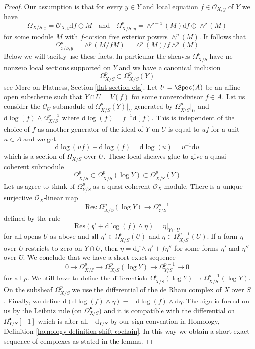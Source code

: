 \begin{proof}
Our assumption is that for every $y \in Y$ and local equation
$f \in \mathcal{O}_{X, y}$ of $Y$ we have
$$
\Omega_{X/S, y} = \mathcal{O}_{X, y}\text{d}f \oplus M
\quad\text{and}\quad
\Omega^p_{X/S, y} = \wedge^{p - 1}(M)\text{d}f \oplus \wedge^p(M)
$$
for some module $M$ with $f$-torsion free exterior powers $\wedge^p(M)$.
It follows that
$$
\Omega^p_{Y/S, y} = \wedge^p(M/fM) = \wedge^p(M)/f\wedge^p(M)
$$
Below we will tacitly use these facts.
In particular the sheaves $\Omega^p_{X/S}$ have no nonzero local
sections supported on $Y$ and we have a canonical inclusion
$$
\Omega^p_{X/S} \subset \Omega^p_{X/S}(Y)
$$
see More on Flatness, Section \ref{flat-section-eta}. Let $U = \Spec(A)$
be an affine open subscheme such that $Y \cap U = V(f)$ for some
nonzerodivisor $f \in A$. Let us consider the $\mathcal{O}_U$-submodule
of $\Omega^p_{X/S}(Y)|_U$ generated by
$\Omega^p_{X/S}|_U$ and $\text{d}\log(f) \wedge \Omega^{p - 1}_{X/S}$
where $\text{d}\log(f) = f^{-1}\text{d}(f)$.
This is independent of the choice of $f$ as another generator of the
ideal of $Y$ on $U$ is equal to $uf$ for a unit $u \in A$ and we get
$$
\text{d}\log(uf) - \text{d}\log(f) = \text{d}\log(u) = u^{-1}\text{d}u
$$
which is a section of $\Omega_{X/S}$ over $U$. These local
sheaves glue to give a quasi-coherent submodule
$$
\Omega^p_{X/S} \subset \Omega^p_{X/S}(\log Y) \subset \Omega^p_{X/S}(Y)
$$
Let us agree to think of $\Omega^p_{Y/S}$ as a quasi-coherent
$\mathcal{O}_X$-module. There is a unique surjective
$\mathcal{O}_X$-linear map
$$
\text{Res} : \Omega^p_{X/S}(\log Y) \to \Omega^{p - 1}_{Y/S}
$$
defined by the rule
$$
\text{Res}(\eta' + \text{d}\log(f) \wedge \eta) = \eta|_{Y \cap U}
$$
for all opens $U$ as above and all
$\eta' \in \Omega^p_{X/S}(U)$ and $\eta \in \Omega^{p - 1}_{X/S}(U)$.
If a form $\eta$ over $U$ restricts to zero on $Y \cap U$, then
$\eta = \text{d}f \wedge \eta' + f\eta''$ for some forms $\eta'$ and $\eta''$
over $U$. We conclude that
we have a short exact sequence
$$
0 \to \Omega^p_{X/S} \to \Omega^p_{X/S}(\log Y) \to \Omega^{p - 1}_{Y/S} \to 0
$$
for all $p$. We still have to define the differentials
$\Omega^p_{X/S}(\log Y) \to \Omega^{p + 1}_{X/S}(\log Y)$.
On the subsheaf $\Omega^p_{X/S}$ we use the differential of
the de Rham complex of $X$ over $S$. Finally, we define
$\text{d}(\text{d}\log(f) \wedge \eta) = -\text{d}\log(f) \wedge \text{d}\eta$.
The sign is forced on us by the Leibniz rule (on $\Omega^\bullet_{X/S}$)
and it is compatible with the differential on $\Omega^\bullet_{Y/S}[-1]$
which is after all $-\text{d}_{Y/S}$ by our sign convention in
Homology, Definition \ref{homology-definition-shift-cochain}.
In this way we obtain a short exact
sequence of complexes as stated in the lemma.
\end{proof}

